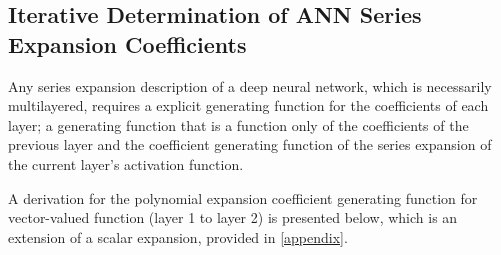 \subsection{Iterative Determination of ANN Series Expansion Coefficients}
{\color{red}
Any series expansion description of a deep neural network, which is necessarily multilayered, requires a explicit generating function for the coefficients of each layer; a generating function that is a function only of the coefficients of the previous layer and the coefficient generating function of the series expansion of the current layer's activation function.

A derivation for the polynomial expansion coefficient generating function for vector-valued function (layer 1 to layer 2) is presented below, which is an extension of a scalar expansion, provided in \ref{appendix}.}

